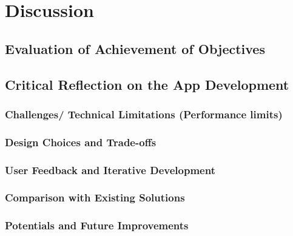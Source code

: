 
\chapter{Discussion}\label{chapter:discussion}

\section{Evaluation of Achievement of Objectives}

\section{Critical Reflection on the App Development}
\subsection{Challenges/ Technical Limitations (Performance limits)}
\subsection{Design Choices and Trade-offs}
\subsection{User Feedback and Iterative Development}
\subsection{Comparison with Existing Solutions}
\subsection{Potentials and Future Improvements}